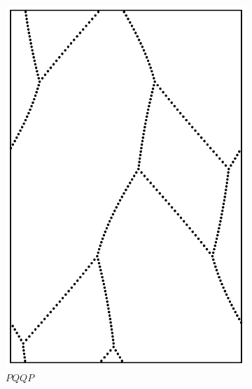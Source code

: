 \documentclass[12pt,twoside]{reedthesis}
\theoremstyle{definition}
\begin{document}
\begin{figure}[h]
\begin{subfigure}[t]{0.24\textwidth}
    \includegraphics[width=\textwidth]{figures/string_cheese_appendix/pqqp.pdf}
    \caption*{$PQQP$}
    \vspace{5mm}
  \end{subfigure}
  \hfill
  \begin{subfigure}[t]{0.24\textwidth}

\end{subfigure}
\end{figure}
\end{document}
